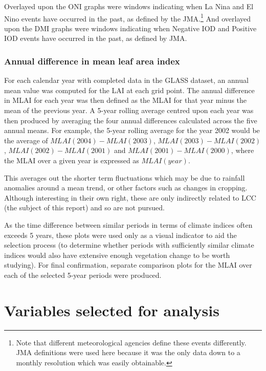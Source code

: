 Overlayed upon the \ac{ONI} graphs were windows indicating when La Nina and El Nino events have occurred in the past, as defined by the \ac{JMA}.\footnote{Note that different meteorological agencies define these events differently. \ac{JMA} definitions were used here because it was the only data down to a monthly resolution which was easily obtainable.} And overlayed upon the \ac{DMI} graphs were windows indicating when Negative \ac{IOD} and Positive \ac{IOD} events have occurred in the past, as defined by \ac{JMA}.

\subsubsection{Annual difference in mean leaf area index}
\label{ssec:mlai_diff}

For each calendar year with completed data in the \ac{GLASS} dataset, an annual mean value was computed for the \ac{LAI} at each grid point. The annual difference in \ac{MLAI} for each year was then defined as the \ac{MLAI} for that year minus the mean of the previous year. A 5-year rolling average centred upon each year was then produced by averaging the four annual differences calculated across the five annual means. For example, the 5-year rolling average for the year 2002 would be the average of $MLAI(2004)-MLAI(2003)$, $MLAI(2003)-MLAI(2002)$, $MLAI(2002)-MLAI(2001)$ and $MLAI(2001)-MLAI(2000)$, where the \ac{MLAI} over a given year is expressed as $MLAI(year)$.

This averages out the shorter term fluctuations which may be due to rainfall anomalies around a mean trend, or other factors such as changes in cropping. Although interesting in their own right, these are only indirectly related to \ac{LCC} (the subject of this report) and so are not pursued.

As the time difference between similar periods in terms of climate indices often exceeds 5 years, these plots were used only as a visual indicator to aid the selection process (to determine whether periods with sufficiently similar climate indices would also have extensive enough vegetation change to be worth studying). For final confirmation, separate comparison plots for the \ac{MLAI} over each of the selected 5-year periods were produced.

\section{Variables selected for analysis}
\label{sec:method_var}

